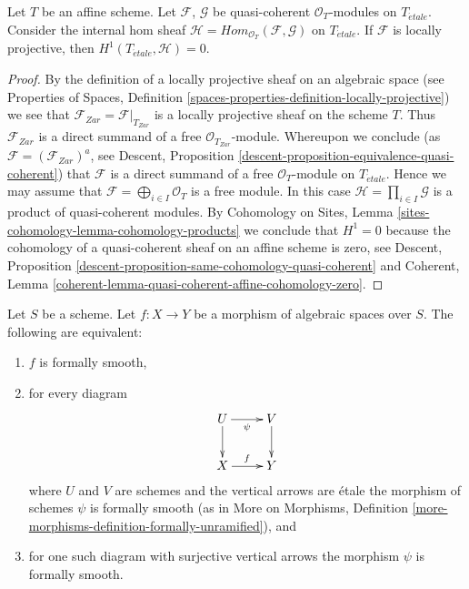 \begin{lemma}
\label{lemma-h1-is-zero}
Let $T$ be an affine scheme.
Let $\mathcal{F}$, $\mathcal{G}$ be quasi-coherent
$\mathcal{O}_T$-modules on $T_{\acute{e}tale}$.
Consider the internal hom sheaf
$\mathcal{H} = \mathit{Hom}_{\mathcal{O}_T}(\mathcal{F}, \mathcal{G})$
on $T_{\acute{e}tale}$.
If $\mathcal{F}$ is locally projective, then
$H^1(T_{\acute{e}tale}, \mathcal{H}) = 0$.
\end{lemma}

\begin{proof}
By the definition of a locally projective sheaf on an algebraic space (see
Properties of Spaces,
Definition \ref{spaces-properties-definition-locally-projective})
we see that $\mathcal{F}_{Zar} = \mathcal{F}|_{T_{Zar}}$ is a locally
projective sheaf on the scheme $T$. Thus $\mathcal{F}_{Zar}$ is a
direct summand of a free $\mathcal{O}_{T_{Zar}}$-module. Whereupon
we conclude (as $\mathcal{F} = (\mathcal{F}_{Zar})^a$, see
Descent, Proposition \ref{descent-proposition-equivalence-quasi-coherent})
that $\mathcal{F}$ is a direct summand of a free $\mathcal{O}_T$-module
on $T_{\acute{e}tale}$. Hence we may assume that
$\mathcal{F} = \bigoplus_{i \in I} \mathcal{O}_T$ is a free module.
In this case $\mathcal{H} = \prod_{i \in I} \mathcal{G}$ is
a product of quasi-coherent modules. By
Cohomology on Sites, Lemma \ref{sites-cohomology-lemma-cohomology-products}
we conclude that $H^1 = 0$ because the cohomology of a quasi-coherent sheaf
on an affine scheme is zero, see
Descent, Proposition \ref{descent-proposition-same-cohomology-quasi-coherent}
and
Coherent, Lemma \ref{coherent-lemma-quasi-coherent-affine-cohomology-zero}.
\end{proof}

\begin{lemma}
\label{lemma-formally-smooth}
Let $S$ be a scheme.
Let $f : X \to Y$ be a morphism of algebraic spaces over
$S$. The following are equivalent:
\begin{enumerate}
\item $f$ is formally smooth,
\item for every diagram
$$
\xymatrix{
U \ar[d] \ar[r]_\psi & V \ar[d] \\
X \ar[r]^f & Y
}
$$
where $U$ and $V$ are schemes and the vertical arrows are \'etale
the morphism of schemes $\psi$ is formally smooth (as in
More on Morphisms,
Definition \ref{more-morphisms-definition-formally-unramified}), and
\item for one such diagram with surjective vertical arrows the morphism
$\psi$ is formally smooth.
\end{enumerate}
\end{lemma}

